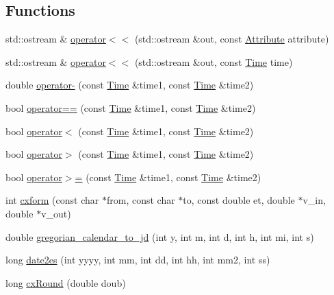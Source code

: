 \subsection*{Functions}
\begin{DoxyCompactItemize}
\item 
std\-::ostream \& \hyperlink{namespaceccmc_ad811f4e9ac8644fea4054b81aabbb072}{operator$<$$<$} (std\-::ostream \&out, const \hyperlink{classccmc_1_1_attribute}{Attribute} attribute)
\item 
std\-::ostream \& \hyperlink{namespaceccmc_ae583b649601da0108ffe024b315cc131}{operator$<$$<$} (std\-::ostream \&out, const \hyperlink{classccmc_1_1_time}{Time} time)
\item 
double \hyperlink{namespaceccmc_a56b029527268b2a7dc0152296e790311}{operator-\/} (const \hyperlink{classccmc_1_1_time}{Time} \&time1, const \hyperlink{classccmc_1_1_time}{Time} \&time2)
\item 
bool \hyperlink{namespaceccmc_a3fce93a0ef72e32c4565e23abdb5e19b}{operator==} (const \hyperlink{classccmc_1_1_time}{Time} \&time1, const \hyperlink{classccmc_1_1_time}{Time} \&time2)
\item 
bool \hyperlink{namespaceccmc_ab38851472be407f010420ed9af48f30b}{operator$<$} (const \hyperlink{classccmc_1_1_time}{Time} \&time1, const \hyperlink{classccmc_1_1_time}{Time} \&time2)
\item 
bool \hyperlink{namespaceccmc_aa8187280256650785ed2835b7ee12574}{operator$>$} (const \hyperlink{classccmc_1_1_time}{Time} \&time1, const \hyperlink{classccmc_1_1_time}{Time} \&time2)
\item 
bool \hyperlink{namespaceccmc_a9d79baffce54b78a54946d6a76743c0b}{operator$>$=} (const \hyperlink{classccmc_1_1_time}{Time} \&time1, const \hyperlink{classccmc_1_1_time}{Time} \&time2)
\item 
int \hyperlink{namespaceccmc_a89959a8566a58d1e6c000d742304be1b}{cxform} (const char $\ast$from, const char $\ast$to, const double et, double $\ast$v\-\_\-in, double $\ast$v\-\_\-out)
\item 
double \hyperlink{namespaceccmc_ae9b36fc97f95279e8815455b796fb78f}{gregorian\-\_\-calendar\-\_\-to\-\_\-jd} (int y, int m, int d, int h, int mi, int s)
\item 
long \hyperlink{namespaceccmc_a2bcda52133fe790c98ff1e09e0d8feef}{date2es} (int yyyy, int mm, int dd, int hh, int mm2, int ss)
\item 
long \hyperlink{namespaceccmc_acbeec2fb0bdcdbe669f213d20cb5d3ac}{cx\-Round} (double doub)
\item 

\end{DoxyCompactItemize}

